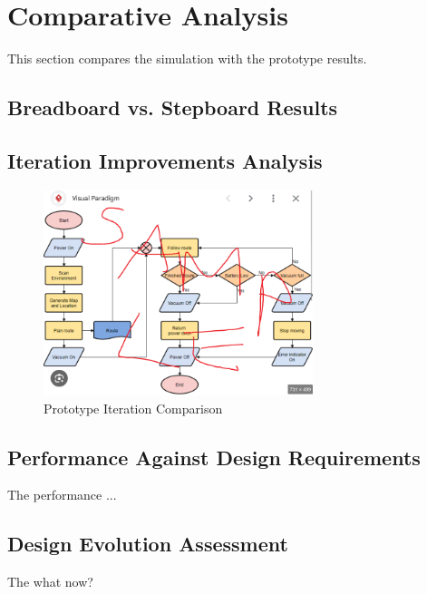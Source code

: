 \section{Comparative Analysis}
 This section compares the simulation with the prototype results.
\subsection{Breadboard vs. Stepboard Results}

\subsection{Iteration Improvements Analysis}

\begin{figure}[htb]
    \centering
    \includegraphics[width=0.7\textwidth]{figures/results/another_flowchart.png}
    \caption{Prototype Iteration Comparison}
    \label{fig:prototypeComparison}
\end{figure}

\subsection{Performance Against Design Requirements}
The performance ...

\subsection{Design Evolution Assessment}
The what now?